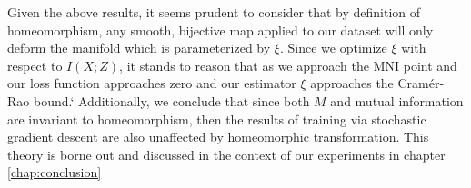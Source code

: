 Given the above results, it seems prudent to consider that by definition of homeomorphism, any smooth, bijective map applied to our dataset will only deform the manifold which is parameterized by $\xi$. 
Since we optimize $\xi$ with respect to $I(X; Z)$, it stands to reason that as we approach the MNI point and our loss function approaches zero and our estimator $\xi$ approaches the Cram\'{e}r-Rao bound.`
Additionally, we conclude that since both $M$ and mutual information are invariant to homeomorphism, then the results of training via stochastic gradient descent are also unaffected by homeomorphic transformation.
This theory is borne out and discussed in the context of our experiments in chapter \ref{chap:conclusion}
